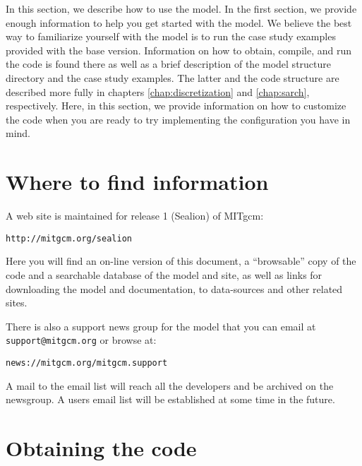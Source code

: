

In this section, we describe how to use the model. In the first
section, we provide enough information to help you get started with
the model. We believe the best way to familiarize yourself with the
model is to run the case study examples provided with the base
version. Information on how to obtain, compile, and run the code is
found there as well as a brief description of the model structure
directory and the case study examples.  The latter and the code
structure are described more fully in chapters
\ref{chap:discretization} and \ref{chap:sarch}, respectively. Here, in
this section, we provide information on how to customize the code when
you are ready to try implementing the configuration you have in mind.

\section{Where to find information}
\label{sect:whereToFindInfo}

A web site is maintained for release 1 (Sealion) of MITgcm:
\begin{verbatim}
http://mitgcm.org/sealion
\end{verbatim}
Here you will find an on-line version of this document, a
``browsable'' copy of the code and a searchable database of the model
and site, as well as links for downloading the model and
documentation, to data-sources and other related sites.

There is also a support news group for the model that you can email at
\texttt{support@mitgcm.org} or browse at:
\begin{verbatim}
news://mitgcm.org/mitgcm.support
\end{verbatim}
A mail to the email list will reach all the developers and be archived
on the newsgroup. A users email list will be established at some time
in the future.


\section{Obtaining the code}
\label{sect:obtainingCode}

